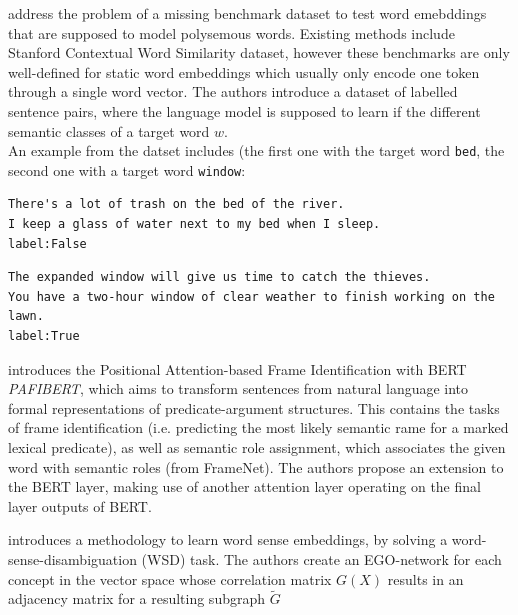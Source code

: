 \documentclass[a4paper,12pt,twoside,openright]{report}
\begin{document}
\cite{pilehvar19} address the problem of a missing benchmark dataset to test word emebddings that are supposed to model polysemous words.
Existing methods include Stanford Contextual Word Similarity dataset, however these benchmarks are only well-defined for static word embeddings which usually only encode one token through a single word vector.
The authors introduce a dataset of labelled sentence pairs, where the language model is supposed to learn if the different semantic classes of a target word $w$. \\

An example from the datset includes (the first one with the target word \Verb#bed#, the second one with a target word \Verb#window#:

\begin{verbatim}
There's a lot of trash on the bed of the river.
I keep a glass of water next to my bed when I sleep.
label:False
\end{verbatim}

\begin{verbatim}
The expanded window will give us time to catch the thieves.
You have a two-hour window of clear weather to finish working on the lawn.
label:True
\end{verbatim}



\cite{tan19} introduces the Positional Attention-based Frame Identification with BERT \textit{PAFIBERT}, which aims to transform sentences from natural language into formal representations of predicate-argument structures.
This contains the tasks of frame identification (i.e. predicting the most likely semantic rame for a marked lexical predicate), as well as semantic role assignment, which associates the given word with semantic roles (from FrameNet).
The authors propose an extension to the BERT layer, making use of another attention layer operating on the final layer outputs of BERT.

\cite{pelevina16} introduces a methodology to learn word sense embeddings, by solving a word-sense-disambiguation (WSD) task.
The authors create an EGO-network for each concept in the vector space whose correlation matrix $G(X)$ results in an adjacency matrix for a resulting subgraph $\tilde{G}$
\end{document}
